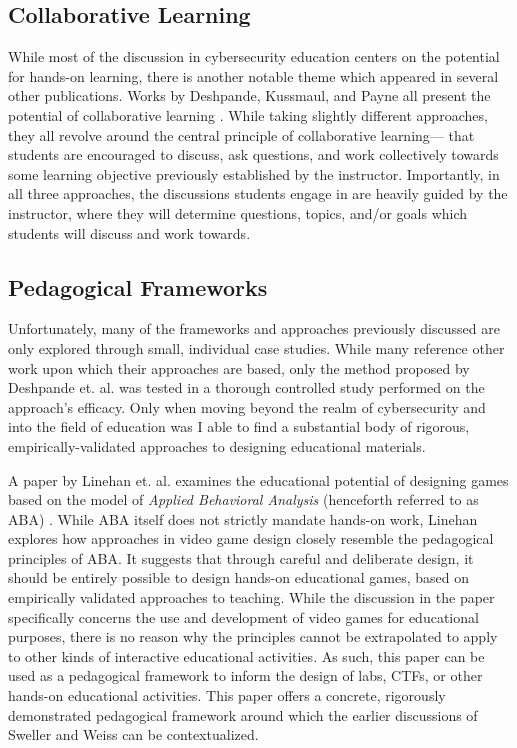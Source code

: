 \subsection{Collaborative Learning}

    While most of the discussion in cybersecurity education centers on the potential for hands-on learning, there is another notable theme which appeared in several other publications. %
Works by Deshpande, Kussmaul, and Payne all present the potential of collaborative learning \cite{P-Deshpande,C-Kussmaul,B-Payne}. %
While taking slightly different approaches, they all revolve around the central principle of collaborative learning---%
that students are encouraged to discuss, ask questions, and work collectively towards some learning objective previously established by the instructor. 
    Importantly, in all three approaches, the discussions students engage in are heavily guided by the instructor, where they will determine questions, topics, and/or goals which students will discuss and work towards. 

\subsection{Pedagogical Frameworks}

    Unfortunately, many of the frameworks and approaches previously discussed are only explored through small, individual case studies. %
While many reference other work upon which their approaches are based, only the method proposed by Deshpande et. al. was tested in a thorough controlled study performed on the approach's efficacy. %
Only when moving beyond the realm of cybersecurity and into the field of education was I able to find a substantial body of rigorous, empirically-validated approaches to designing educational materials. 

    A paper by Linehan et. al. examines the educational potential of designing games based on the model of \emph{Applied Behavioral Analysis} (henceforth referred to as ABA) \cite{C-Linehan}. %
While ABA itself does not strictly mandate hands-on work, Linehan explores how approaches in video game design closely resemble the pedagogical principles of ABA. It suggests that through careful and deliberate design, it should be entirely possible to design hands-on educational games, based on empirically validated approaches to teaching. %
While the discussion in the paper specifically concerns the use and development of video games for educational purposes, there is no reason why the principles cannot be extrapolated to apply to other kinds of interactive educational activities. %
As such, this paper can be used as a pedagogical framework to inform the design of labs, CTFs, or other hands-on educational activities. %
This paper offers a concrete, rigorously demonstrated pedagogical framework around which the earlier discussions of Sweller and Weiss can be contextualized. 


